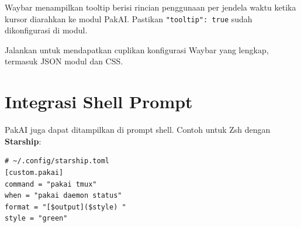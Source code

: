 \begin{sloppypar}
Waybar menampilkan tooltip berisi rincian penggunaan per jendela waktu ketika
kursor diarahkan ke modul PakAI. Pastikan \texttt{"tooltip": true} sudah
dikonfigurasi di modul.
\end{sloppypar}

\begin{tipbox}
  Jalankan  untuk mendapatkan cuplikan konfigurasi
  Waybar yang lengkap, termasuk JSON modul dan CSS.
\end{tipbox}

\section{Integrasi Shell Prompt}

PakAI juga dapat ditampilkan di prompt shell. Contoh untuk Zsh dengan
\textbf{Starship}:

\begin{lstlisting}[style=toml]
# ~/.config/starship.toml
[custom.pakai]
command = "pakai tmux"
when = "pakai daemon status"
format = "[$output]($style) "
style = "green"
\end{lstlisting}
